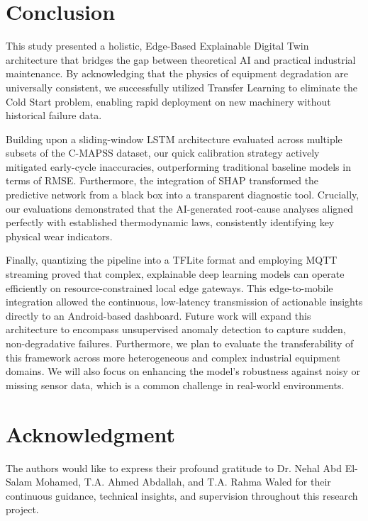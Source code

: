 \documentclass[journal]{IEEEtran}
\begin{document}
\section{Conclusion}
This study presented a holistic, Edge-Based Explainable Digital Twin architecture that bridges the gap between theoretical AI and practical industrial maintenance. By acknowledging that the physics of equipment degradation are universally consistent, we successfully utilized Transfer Learning to eliminate the Cold Start problem, enabling rapid deployment on new machinery without historical failure data. 

Building upon a sliding-window LSTM architecture evaluated across multiple subsets of the C-MAPSS dataset, our quick calibration strategy actively mitigated early-cycle inaccuracies, outperforming traditional baseline models in terms of RMSE. Furthermore, the integration of SHAP transformed the predictive network from a black box into a transparent diagnostic tool. Crucially, our evaluations demonstrated that the AI-generated root-cause analyses aligned perfectly with established thermodynamic laws, consistently identifying key physical wear indicators.

Finally, quantizing the pipeline into a TFLite format and employing MQTT streaming proved that complex, explainable deep learning models can operate efficiently on resource-constrained local edge gateways. This edge-to-mobile integration allowed the continuous, low-latency transmission of actionable insights directly to an Android-based dashboard. Future work will expand this architecture to encompass unsupervised anomaly detection to capture sudden, non-degradative failures. Furthermore, we plan to evaluate the transferability of this framework across more heterogeneous and complex industrial equipment domains. We will also focus on enhancing the model's robustness against noisy or missing sensor data, which is a common challenge in real-world environments.

\section*{Acknowledgment}
The authors would like to express their profound gratitude to Dr. Nehal Abd El-Salam Mohamed, T.A. Ahmed Abdallah, and T.A. Rahma Waled for their continuous guidance, technical insights, and supervision throughout this research project.
\end{document}
